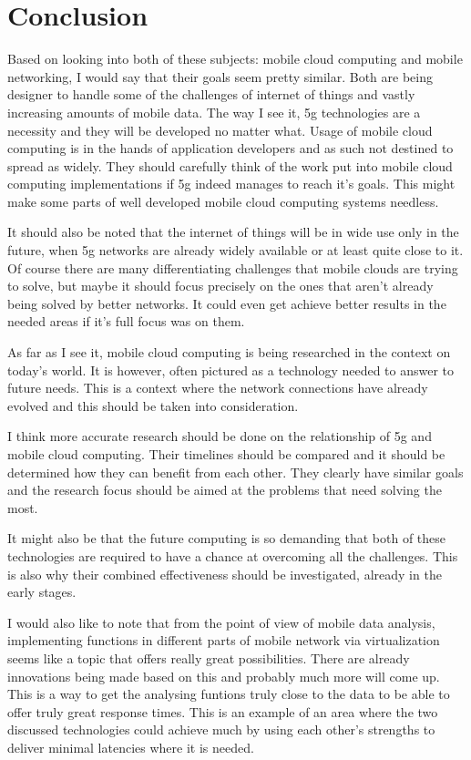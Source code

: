 \documentclass[conference]{IEEEtran}
\begin{document}
\section{Conclusion}
Based on looking into both of these subjects: mobile cloud computing and mobile networking, I would say that their goals seem pretty similar. Both are being designer to handle some of the challenges of internet of things and vastly increasing amounts of mobile data. The way I see it, 5g technologies are a necessity and they will be developed no matter what. Usage of mobile cloud computing is in the hands of application developers and as such not destined to spread as widely. They should carefully think of the work put into mobile cloud computing implementations if 5g indeed manages to reach it's goals. This might make some parts of well developed mobile cloud computing systems needless.
\par
It should also be noted that the internet of things will be in wide use only in the future, when 5g networks are already widely available or at least quite close to it. Of course there are many differentiating challenges that mobile clouds are trying to solve, but maybe it should focus precisely on the ones that aren't already being solved by better networks. It could even get achieve better results in the needed areas if it's full focus was on them.
\par
As far as I see it, mobile cloud computing is being researched in the context on today's world. It is however, often pictured as a technology needed to answer to future needs. This is a context where the network connections have already evolved and this should be taken into consideration.
\par
I think more accurate research should be done on the relationship of 5g and mobile cloud computing. Their timelines should be compared and it should be determined how they can benefit from each other. They clearly have similar goals and the research focus should be aimed at the problems that need solving the most.
\par
It might also be that the future computing is so demanding that both of these technologies are required to have a chance at overcoming all the challenges. This is also why their combined effectiveness should be investigated, already in the early stages.
\par
I would also like to note that from the point of view of mobile data analysis, implementing functions in different parts of mobile network via virtualization seems like a topic that offers really great possibilities. There are already innovations being made based on this and probably much more will come up. This is a way to get the analysing funtions truly close to the data to be able to offer truly great response times. This is an example of an area where the two discussed technologies could achieve much by using each other's strengths to deliver minimal latencies where it is needed.
\end{document}
